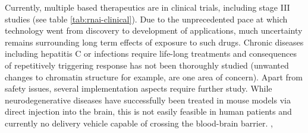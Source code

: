 Currently, multiple  based therapeutics are in clinical trials, including stage III studies (see table \ref{tab:rnai-clinical}). Due to the unprecedented pace at which  technology went from discovery to development of applications, much uncertainty remains surrounding long term effects of exposure to such drugs. Chronic diseases including hepatitis C or  infections require life-long treatments and consequences of repetitively triggering  response has not been thoroughly studied (unwanted changes to chromatin structure for example, are one area of concern). Apart from safety issues, several implementation aspects require further study. While neurodegenerative diseases have successfully been treated in mouse models via direct injection into the brain, this is not easily feasible in human patients and currently no delivery vehicle capable of crossing the blood-brain barrier. \citep{Kim2007,Whitehead2009},
